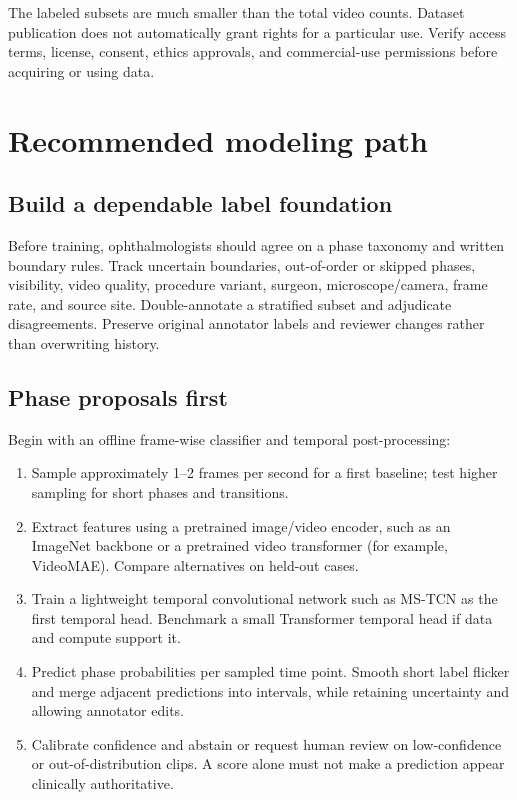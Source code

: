 \documentclass[11pt,a4paper]{article}
\begin{document}
The labeled subsets are much smaller than the total video counts. Dataset publication does not automatically grant rights for a particular use. Verify access terms, license, consent, ethics approvals, and commercial-use permissions before acquiring or using data.

\section{Recommended modeling path}

\subsection{Build a dependable label foundation}

Before training, ophthalmologists should agree on a phase taxonomy and written boundary rules. Track uncertain boundaries, out-of-order or skipped phases, visibility, video quality, procedure variant, surgeon, microscope/camera, frame rate, and source site. Double-annotate a stratified subset and adjudicate disagreements. Preserve original annotator labels and reviewer changes rather than overwriting history.

\subsection{Phase proposals first}

Begin with an offline frame-wise classifier and temporal post-processing:
\begin{enumerate}
  \item Sample approximately 1--2 frames per second for a first baseline; test higher sampling for short phases and transitions.
  \item Extract features using a pretrained image/video encoder, such as an ImageNet backbone or a pretrained video transformer (for example, VideoMAE). Compare alternatives on held-out cases.
  \item Train a lightweight temporal convolutional network such as MS-TCN as the first temporal head. Benchmark a small Transformer temporal head if data and compute support it.
  \item Predict phase probabilities per sampled time point. Smooth short label flicker and merge adjacent predictions into intervals, while retaining uncertainty and allowing annotator edits.
  \item Calibrate confidence and abstain or request human review on low-confidence or out-of-distribution clips. A score alone must not make a prediction appear clinically authoritative.
\end{enumerate}
\end{document}

